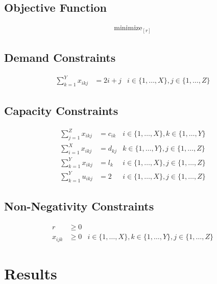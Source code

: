 \documentclass[12pt]{article} %
\begin{document}
\subsection{Objective Function}

\begin{align}
\text{minimize}_{[r]}
\end{align}

\subsection{Demand Constraints}

\begin{align}
\sum_{k = 1}^{Y} x_{ikj} &= 2i + j & i \in \{1, \ldots, X\}, j \in \{1, \ldots, Z\}
\end{align}

\subsection{Capacity Constraints}

\begin{align}
\sum_{j = 1}^{Z} x_{ikj} &= c_{ik} & i \in \{1, \ldots, X\}, k \in \{1, \ldots, Y\} \\[1em]
\sum_{i = 1}^{X} x_{ikj} &= d_{kj} & k \in \{1, \ldots, Y\}, j \in \{1, \ldots, Z\} \\[1em]
\sum_{k = 1}^{Y} x_{ikj} &= l_k & i \in \{1, \ldots, X\}, j \in \{1, \ldots, Z\} \\[1em]
\sum_{k = 1}^{Y} u_{ikj} &= 2 & i \in \{1, \ldots, X\}, j \in \{1, \ldots, Z\}
\end{align}

\subsection{Non-Negativity Constraints}

\begin{align}
r &\geq 0 \\[1em]
x_{ijk} &\geq 0 & i \in \{1, \ldots, X\}, k \in \{1, \ldots, Y\}, j \in \{1, \ldots, Z\}
\end{align}



\section{Results}
\end{document}
